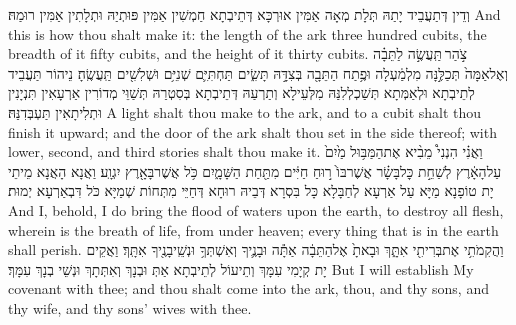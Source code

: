 {וְדֵין דְּתַעֲבֵיד יָתַהּ תְּלָת מְאָה אַמִּין אוּרְכָּא דְּתֵיבְתָא חַמְשִׁין אַמִּין פּוּתְיַהּ וּתְלָתִין אַמִּין רוּמַהּ׃}
{And this is how thou shalt make it: the length of the ark three hundred cubits, the breadth of it fifty cubits, and the height of it thirty cubits.}{}
{צֹ֣הַר \legarmeh  תַּֽעֲשֶׂ֣ה לַתֵּבָ֗ה וְאֶל\maqqaf אַמָּה֙ תְּכַלֶּ֣נָּה מִלְמַ֔עְלָה וּפֶ֥תַח הַתֵּבָ֖ה בְּצִדָּ֣הּ תָּשִׂ֑ים תַּחְתִּיִּ֛ם שְׁנִיִּ֥ם וּשְׁלִשִׁ֖ים תַּֽעֲשֶֽׂהָ׃}
{נֵיהוֹר תַּעֲבֵיד לְתֵיבְתָא וּלְאַמְּתָא תְּשַׁכְלְלִנַּהּ מִלְּעֵילָא וְתַרְעַהּ דְּתֵיבְתָא בְּסִטְרַהּ תְּשַׁוֵּי מְדוֹרִין אַרְעָאִין תִּנְיָנִין וּתְלִיתָאִין תַּעְבְּדִנַּהּ׃}
{A light shalt thou make to the ark, and to a cubit shalt thou finish it upward; and the door of the ark shalt thou set in the side thereof; with lower, second, and third stories shalt thou make it.}{}
{וַאֲנִ֗י הִנְנִי֩ מֵבִ֨יא אֶת\maqqaf הַמַּבּ֥וּל מַ֙יִם֙ עַל\maqqaf הָאָ֔רֶץ לְשַׁחֵ֣ת כׇּל\maqqaf בָּשָׂ֗ר אֲשֶׁר\maqqaf בּוֹ֙ ר֣וּחַ חַיִּ֔ים מִתַּ֖חַת הַשָּׁמָ֑יִם כֹּ֥ל אֲשֶׁר\maqqaf בָּאָ֖רֶץ יִגְוָֽע׃}
{וַאֲנָא הָאֲנָא מֵיתֵי יָת טוֹפָנָא מַיָּא עַל אַרְעָא לְחַבָּלָא כָּל בִּסְרָא דְּבֵיהּ רוּחָא דְּחַיֵּי מִתְּחוֹת שְׁמַיָּא כֹּל דִּבְאַרְעָא יְמוּת׃}
{And I, behold, I do bring the flood of waters upon the earth, to destroy all flesh, wherein is the breath of life, from under heaven; every thing that is in the earth shall perish.}{}
{וַהֲקִמֹתִ֥י אֶת\maqqaf בְּרִיתִ֖י אִתָּ֑ךְ וּבָאתָ֙ אֶל\maqqaf הַתֵּבָ֔ה אַתָּ֕ה וּבָנֶ֛יךָ וְאִשְׁתְּךָ֥ וּנְשֵֽׁי\maqqaf בָנֶ֖יךָ אִתָּֽךְ׃}
{וַאֲקֵים יָת קְיָמִי עִמָּךְ וְתֵיעוֹל לְתֵיבְתָא אַתְּ וּבְנָךְ וְאִתְּתָךְ וּנְשֵׁי בְנָךְ עִמָּךְ׃}
{But I will establish My covenant with thee; and thou shalt come into the ark, thou, and thy sons, and thy wife, and thy sons’ wives with thee.}{}
